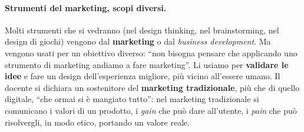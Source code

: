 \paragraph{Strumenti del marketing, scopi diversi.} Molti strumenti che si vedranno (nel
design thinking, nel brainstorming, nel design di giochi) vengono dal \textbf{marketing}
o dal \emph{business development}. Ma vengono usati per un obiettivo diverso: ``non
bisogna pensare che applicando uno strumento di marketing andiamo a fare marketing''.
Li usiamo per \textbf{validare le idee} e fare un design dell'esperienza migliore, più
vicino all'essere umano. Il docente si dichiara un sostenitore del \textbf{marketing
tradizionale}, più che di quello digitale, ``che ormai si è mangiato tutto'': nel
marketing tradizionale si comunicano i valori di un prodotto, i \emph{gain} che può dare
all'utente, i \emph{pain} che può risolvergli, in modo etico, portando un valore reale.

